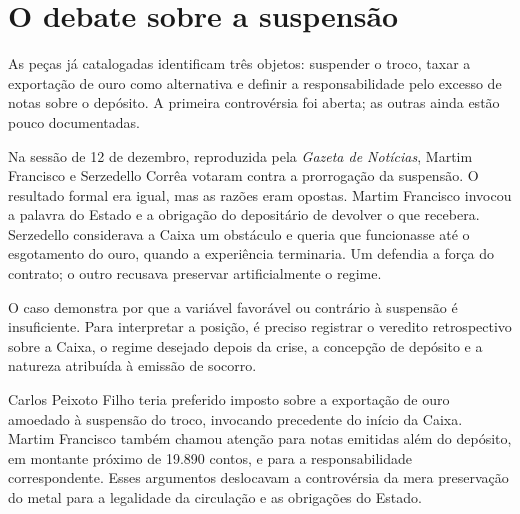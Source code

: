 
\section{O debate sobre a suspensão}

As peças já catalogadas identificam três objetos: suspender o troco, taxar a exportação de ouro como alternativa e definir a responsabilidade pelo excesso de notas sobre o depósito. A primeira controvérsia foi aberta; as outras ainda estão pouco documentadas.

Na sessão de 12 de dezembro, reproduzida pela \textit{Gazeta de Notícias}, Martim Francisco e Serzedello Corrêa votaram contra a prorrogação da suspensão. O resultado formal era igual, mas as razões eram opostas. Martim Francisco invocou a palavra do Estado e a obrigação do depositário de devolver o que recebera. Serzedello considerava a Caixa um obstáculo e queria que funcionasse até o esgotamento do ouro, quando a experiência terminaria. Um defendia a força do contrato; o outro recusava preservar artificialmente o regime.


O caso demonstra por que a variável favorável ou contrário à suspensão é insuficiente. Para interpretar a posição, é preciso registrar o veredito retrospectivo sobre a Caixa, o regime desejado depois da crise, a concepção de depósito e a natureza atribuída à emissão de socorro.

Carlos Peixoto Filho teria preferido imposto sobre a exportação de ouro amoedado à suspensão do troco, invocando precedente do início da Caixa. Martim Francisco também chamou atenção para notas emitidas além do depósito, em montante próximo de 19.890 contos, e para a responsabilidade correspondente. Esses argumentos deslocavam a controvérsia da mera preservação do metal para a legalidade da circulação e as obrigações do Estado.


